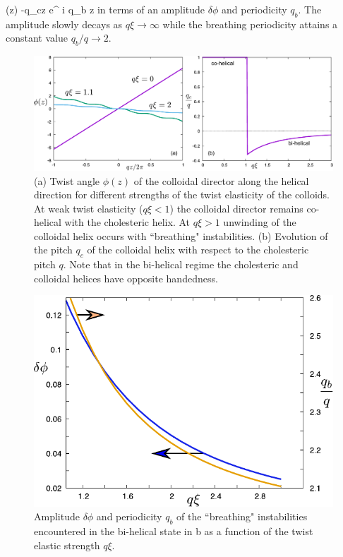 \beq
\phi(z) -q_{c}z \approx   \delta \phi e^{  i q_{b} z }
\label{nlinrip}
\eeq
in terms of an amplitude $\delta \phi$ and periodicity $q_{b}$. The amplitude slowly decays as $q \xi \rightarrow \infty $ while the breathing periodicity attains a constant value $q_{b}/q \rightarrow 2$.



   \begin{figure}
	\includegraphics[width = \columnwidth]{figures/chapter-4/ripplediagram}
	\caption{ (a) Twist angle $\phi(z)$ of the colloidal director along the helical direction for different strengths of the twist elasticity of the colloids. At weak twist elasticity  ($q \xi <1$) the colloidal director remains co-helical with the cholesteric helix.  At $q \xi >1$ unwinding of the colloidal helix occurs with  ``breathing" instabilities. (b) Evolution of the pitch $q_{c}$ of the colloidal helix with respect to the cholesteric pitch $q$. Note that in the bi-helical regime the cholesteric and colloidal helices have opposite handedness.  }
	\label{unwind}
\end{figure}


 \begin{figure}
	\includegraphics[width = .8\columnwidth]{figures/chapter-4/fluctuations}
	\caption{ Amplitude $\delta \phi$ and periodicity $q_{b}$ of the ``breathing" instabilities encountered in the bi-helical state in b as a function of the twist elastic strength $q \xi$. }
	\label{fluc}
\end{figure}

